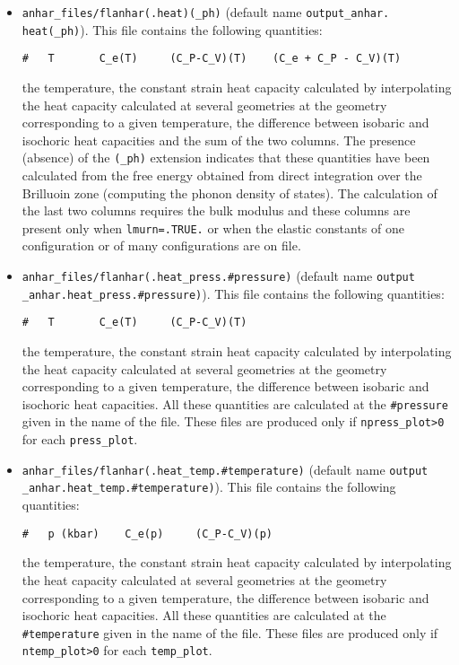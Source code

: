 \documentclass[12pt,a4paper,twoside]{report}
\begin{document}
\begin{itemize}
\item 
\texttt{anhar\_files/flanhar(.heat)(\_ph)}
(default name \texttt{output\_anhar.}\\ \texttt{heat(\_ph)}). 
This file contains the following quantities:
\begin{verbatim}
#   T       C_e(T)     (C_P-C_V)(T)    (C_e + C_P - C_V)(T)    
\end{verbatim}
the temperature, the constant strain heat capacity calculated 
by interpolating the heat capacity calculated at several geometries 
at the geometry corresponding to a given temperature, the
difference between isobaric and isochoric heat capacities and the
sum of the two columns. 
The presence (absence) of the \texttt{(\_ph)} extension indicates that
these quantities have been calculated from the free energy obtained from 
direct integration over the Brilluoin zone (computing the phonon density
of states). 
The calculation of the last two columns requires the bulk modulus
and these columns are present only when \texttt{lmurn=.TRUE.} or 
when the elastic constants of one configuration or of many configurations
are on file. 

\item 
\texttt{anhar\_files/flanhar(.heat\_press.\#pressure)}
(default name \texttt{output} \texttt{\_anhar.heat\_press.\#pressure)}). 
This file contains the following quantities:
\begin{verbatim}
#   T       C_e(T)     (C_P-C_V)(T)    
\end{verbatim}
the temperature, the constant strain heat capacity calculated 
by interpolating the heat capacity calculated at several geometries 
at the geometry corresponding to a given temperature, the
difference between isobaric and isochoric heat capacities. 
All these quantities are calculated at the \texttt{\#pressure} given
in the name of the file.
These files are produced only if \texttt{npress\_plot>0} for each
\texttt{press\_plot}. 

\item 
\texttt{anhar\_files/flanhar(.heat\_temp.\#temperature)}
(default name \texttt{output} \texttt{\_anhar.heat\_temp.\#temperature)}). 
This file contains the following quantities:
\begin{verbatim}
#   p (kbar)    C_e(p)     (C_P-C_V)(p)    
\end{verbatim}
the temperature, the constant strain heat capacity calculated 
by interpolating the heat capacity calculated at several geometries 
at the geometry corresponding to a given temperature, the
difference between isobaric and isochoric heat capacities. 
All these quantities are calculated at the \texttt{\#temperature} given
in the name of the file.
These files are produced only if \texttt{ntemp\_plot>0} for each
\texttt{temp\_plot}. 


\end{itemize}
\end{document}

